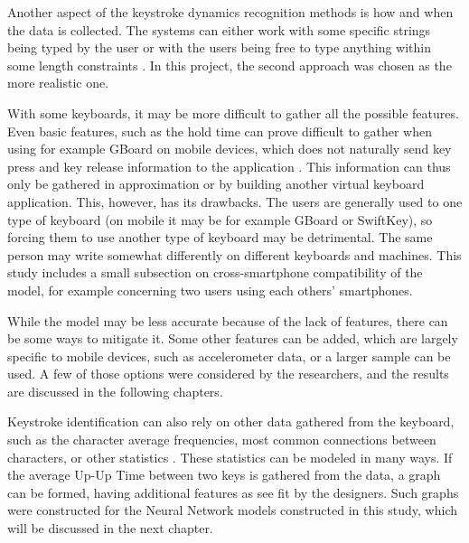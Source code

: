 Another aspect of the keystroke dynamics recognition methods is how and when the data is collected. The systems can either work with some specific strings being typed by the user \cite{ceker_cnn2017} or with the users being free to type anything within some length constraints \cite{Lu2020}. In this project, the second approach was chosen as the more realistic one.

With some keyboards, it may be more difficult to gather all the possible features. Even basic features, such as the hold time can prove difficult to gather when using for example GBoard on mobile devices, which does not naturally send key press and key release information to the application \cite{android_keyboard_commands_2025}. This information can thus only be gathered in approximation or by building another virtual keyboard application. This, however, has its drawbacks. The users are generally used to one type of keyboard (on mobile it may be for example GBoard or SwiftKey), so forcing them to use another type of keyboard may be detrimental. The same person may write somewhat differently on different keyboards and machines. This study includes a small subsection on cross-smartphone compatibility of the model, for example concerning two users using each others' smartphones.

While the model may be less accurate because of the lack of features, there can be some ways to mitigate it. Some other features can be added, which are largely specific to mobile devices, such as accelerometer data, or a larger sample can be used. A few of those options were considered by the researchers, and the results are discussed in the following chapters.

Keystroke identification can also rely on other data gathered from the keyboard, such as the character average frequencies, most common connections between characters, or other statistics \cite{Wang2024}. These statistics can be modeled in many ways. If the average Up-Up Time between two keys is gathered from the data, a graph can be formed, having additional features as see fit by the designers. Such graphs were constructed for the Neural Network models constructed in this study, which will be discussed in the next chapter.